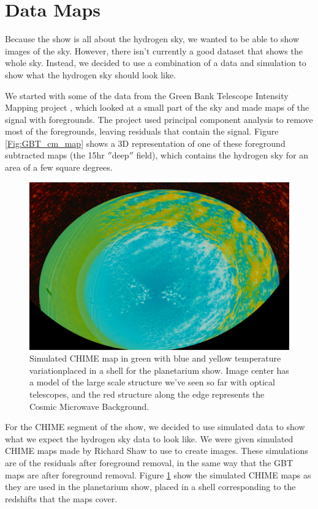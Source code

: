 \section{\cm Data Maps}
Because the show is all about the hydrogen sky, we wanted to be able to show images of the sky. However, there isn't currently a good dataset that shows the whole sky. Instead, we decided to use a combination of a data and simulation to show what the hydrogen sky should look like.

We started with some of the data from the Green Bank Telescope Intensity Mapping project \cite{masui_2012}\cite{switzer_2013}, which looked at a small part of the sky and made maps of the \cm signal with foregrounds. The project used principal component analysis to remove most of the foregrounds, leaving residuals that contain the \cm signal. Figure \ref{Fig:GBT_cm_map} shows a 3D representation of one of these foreground subtracted maps (the 15hr $''$deep$''$ field), which contains the hydrogen sky for an area of a few square degrees. 

\begin{figure}[htb]
\begin{center}
\includegraphics[width=0.95\linewidth]{Planetarium/figures/CHIME_cm_map.jpg}
\caption{Simulated CHIME map in green with blue and yellow temperature variationplaced in a shell for the planetarium show. Image center has a model of the large scale structure we've seen so far with optical telescopes, and the red structure along the edge represents the Cosmic Microwave Background.  }
\label{Fig:CHIME_cm_map}
\end{center}
\end{figure}

For the CHIME segment of the show, we decided to use simulated data to show what we expect the hydrogen sky data to look like. We were given simulated CHIME \cm maps made by Richard Shaw \cite{shaw_2014} to use to create images. These simulations are of the \cm residuals after foreground removal, in the same way that the GBT maps are after foreground removal. Figure \ref{Fig:CHIME_cm_map} show the simulated CHIME maps as they are used in the planetarium show, placed in a shell corresponding to the redshifts that the maps cover. 

